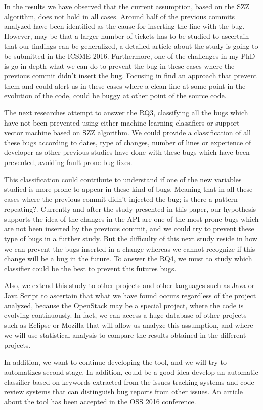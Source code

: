 \documentclass[ifip]{svmult}
\begin{document}
In the results we have observed that the current assumption, based on the SZZ algorithm, does not hold in all cases. Around half of the previous commits analyzed have been identified as the cause for inserting the line with the bug. However, may be that a larger number of tickets has to be studied to ascertain that our findings can be generalized, a detailed article about the study is going to be submitted in the ICSME 2016. Furthermore, one of the challenges in my PhD is go in depth what we can do to prevent the bug in these cases where the previous commit didn't insert the bug. Focusing in find an approach that prevent them and could alert us in these cases where a clean line at some point in the evolution of the code, could be buggy at other point of the source code. 

The next researches attempt to answer the RQ3, classifying all the bugs which have not been prevented using either machine learning classifiers or support vector machine based on SZZ algorithm. We could provide a classification of all these bugs according to dates, type of changes, number of lines or 
experience of developer as other previous studies have done with these bugs which have been prevented, avoiding fault prone bug fixes.

This classification could contribute to understand if one of the new variables studied is more prone to appear in these kind of bugs. Meaning that in all these cases where the previous commit didn't injected the bug; is there a pattern repeating?. Currently and after the study presented in this paper, our hypothesis supports the idea of the changes in the API are one of the most prone bugs which are not been inserted by the previous commit, and we could try to prevent these type of bugs in a further study. But the difficulty of this next study reside in how we can prevent the bugs inserted in a change whereas we cannot recognize if this change will be a bug in the future. To answer the RQ4, we must to study which classifier could be the best to prevent this futures bugs.

Also, we extend this study to other projects and other languages such as Java or Java Script to ascertain that what we have found occurs regardless of the project analyzed, because the OpenStack may be a special project, where the code is evolving continuously. In fact, we can access a huge database of other projects such as Eclipse or Mozilla that will allow us analyze this assumption, and where we will use statistical analysis to compare the results obtained in the different projects. 

In addition, we want to continue developing the tool, and we will try to automatizes second stage. In addition, could be a good idea develop an automatic classifier based on keywords extracted from the issues tracking systems and code review systems that can distinguish bug reports from other issues. An article about the tool has been accepted in the OSS 2016 conference.



\end{document}
